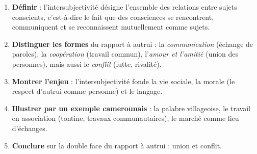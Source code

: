 \documentclass[11pt]{article}
\newcommand{\cle}[1]{{\popxbold\color{popdark}#1}}
\begin{document}
\begin{methode}
\begin{enumerate}
\item \textbf{Définir} : l'\cle{intersubjectivité} désigne l'ensemble des relations entre sujets conscients, c'est-à-dire le fait que des consciences se rencontrent, communiquent et se reconnaissent mutuellement comme sujets.
\item \textbf{Distinguer les formes} du rapport à autrui : la \emph{communication} (échange de paroles), la \emph{coopération} (travail commun), l'\emph{amour et l'amitié} (union des personnes), mais aussi le \emph{conflit} (lutte, rivalité).
\item \textbf{Montrer l'enjeu} : l'intersubjectivité fonde la vie sociale, la morale (le respect d'autrui comme personne) et le langage.
\item \textbf{Illustrer par un exemple camerounais} : la palabre villageoise, le travail en association (tontine, travaux communautaires), le marché comme lieu d'échanges.
\item \textbf{Conclure} sur la double face du rapport à autrui : union et conflit.
\end{enumerate}
\end{methode}
\end{document}
